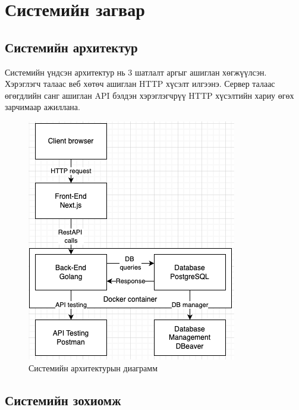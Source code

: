 
\section{Системийн загвар}

\subsection{Системийн архитектур}
Системийн үндсэн архитектур нь 3 шатлалт аргыг ашиглан хөгжүүлсэн. Хэрэглэгч талаас веб хөтөч ашиглан HTTP хүсэлт илгээнэ. 
Сервер талаас өгөгдлийн санг ашиглан API бэлдэн хэрэглэгчрүү  HTTP хүсэлтийн хариу өгөх зарчимаар ажиллана.
\begin{figure}[h]
    \centering
    \includegraphics[scale=0.8]{src/images/diagram/arch.png}
    \caption{Системийн архитектурын диаграмм}
    \label{fig:system_architecture_diagram}
\end{figure}

\subsection{Системийн зохиомж}


